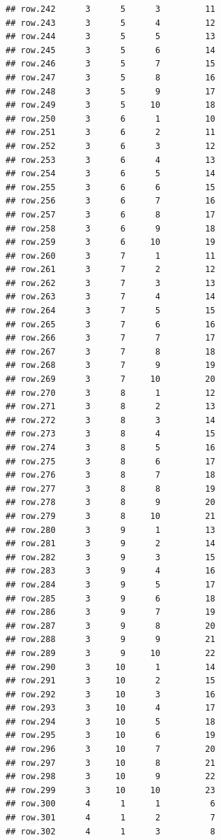 \documentclass[
]{article}
\begin{document}
\begin{verbatim}
## row.242      3      5      3         11
## row.243      3      5      4         12
## row.244      3      5      5         13
## row.245      3      5      6         14
## row.246      3      5      7         15
## row.247      3      5      8         16
## row.248      3      5      9         17
## row.249      3      5     10         18
## row.250      3      6      1         10
## row.251      3      6      2         11
## row.252      3      6      3         12
## row.253      3      6      4         13
## row.254      3      6      5         14
## row.255      3      6      6         15
## row.256      3      6      7         16
## row.257      3      6      8         17
## row.258      3      6      9         18
## row.259      3      6     10         19
## row.260      3      7      1         11
## row.261      3      7      2         12
## row.262      3      7      3         13
## row.263      3      7      4         14
## row.264      3      7      5         15
## row.265      3      7      6         16
## row.266      3      7      7         17
## row.267      3      7      8         18
## row.268      3      7      9         19
## row.269      3      7     10         20
## row.270      3      8      1         12
## row.271      3      8      2         13
## row.272      3      8      3         14
## row.273      3      8      4         15
## row.274      3      8      5         16
## row.275      3      8      6         17
## row.276      3      8      7         18
## row.277      3      8      8         19
## row.278      3      8      9         20
## row.279      3      8     10         21
## row.280      3      9      1         13
## row.281      3      9      2         14
## row.282      3      9      3         15
## row.283      3      9      4         16
## row.284      3      9      5         17
## row.285      3      9      6         18
## row.286      3      9      7         19
## row.287      3      9      8         20
## row.288      3      9      9         21
## row.289      3      9     10         22
## row.290      3     10      1         14
## row.291      3     10      2         15
## row.292      3     10      3         16
## row.293      3     10      4         17
## row.294      3     10      5         18
## row.295      3     10      6         19
## row.296      3     10      7         20
## row.297      3     10      8         21
## row.298      3     10      9         22
## row.299      3     10     10         23
## row.300      4      1      1          6
## row.301      4      1      2          7
## row.302      4      1      3          8

\end{verbatim}
\end{document}
